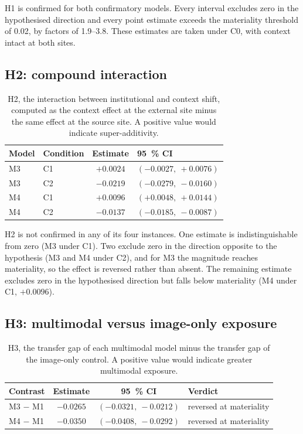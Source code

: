 H1 is confirmed for both confirmatory models. Every interval excludes zero in
the hypothesised direction and every point estimate exceeds the materiality
threshold of \num{0.02}, by factors of \numrange{1.9}{3.8}. These estimates are
taken under C0, with context intact at both sites.

\subsection{H2: compound interaction}

\begin{table}[htbp]
\centering
\caption{H2, the interaction between institutional and context shift, computed
as the context effect at the external site minus the same effect at the source
site. A positive value would indicate super-additivity.}
\label{tab:h2}
\begin{tabular}{llcl}
\toprule
Model & Condition & Estimate & \SI{95}{\percent} CI \\
\midrule
M3 & C1 & $+0.0024$ & $(-0.0027,\ +0.0076)$ \\
M3 & C2 & $-0.0219$ & $(-0.0279,\ -0.0160)$ \\
M4 & C1 & $+0.0096$ & $(+0.0048,\ +0.0144)$ \\
M4 & C2 & $-0.0137$ & $(-0.0185,\ -0.0087)$ \\
\bottomrule
\end{tabular}
\end{table}

H2 is not confirmed in any of its four instances. One estimate is
indistinguishable from zero (M3 under C1). Two exclude zero in the direction
opposite to the hypothesis (M3 and M4 under C2), and for M3 the magnitude
reaches materiality, so the effect is reversed rather than absent. The
remaining estimate excludes zero in the hypothesised direction but falls below
materiality (M4 under C1, $+0.0096$).

\subsection{H3: multimodal versus image-only exposure}

\begin{table}[htbp]
\centering
\caption{H3, the transfer gap of each multimodal model minus the transfer gap of
the image-only control. A positive value would indicate greater multimodal
exposure.}
\label{tab:h3}
\begin{tabular}{lccl}
\toprule
Contrast & Estimate & \SI{95}{\percent} CI & Verdict \\
\midrule
M3 $-$ M1 & $-0.0265$ & $(-0.0321,\ -0.0212)$ & reversed at materiality \\
M4 $-$ M1 & $-0.0350$ & $(-0.0408,\ -0.0292)$ & reversed at materiality \\
\bottomrule
\end{tabular}
\end{table}

